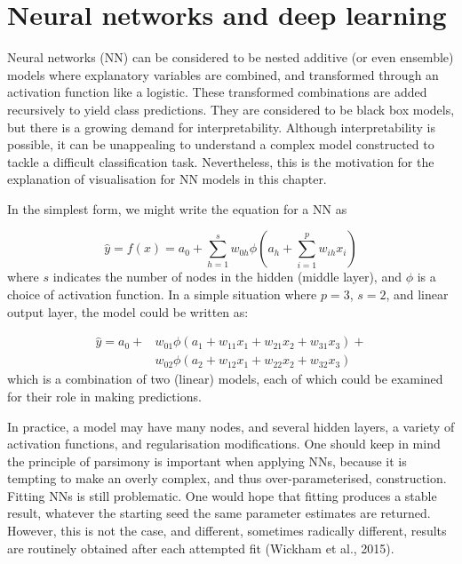 \documentclass[
  letterpaper,
]{krantz}
\begin{document}

\chapter{Neural networks and deep
learning}\label{neural-networks-and-deep-learning}


Neural networks (NN) can be considered to be nested additive (or even
ensemble) models where explanatory variables are combined, and
transformed through an activation function like a logistic. These
transformed combinations are added recursively to yield class
predictions. They are considered to be black box models, but there is a
growing demand for interpretability. Although interpretability is
possible, it can be unappealing to understand a complex model
constructed to tackle a difficult classification task. Nevertheless,
this is the motivation for the explanation of visualisation for NN
models in this chapter.

In the simplest form, we might write the equation for a NN as

\[
\hat{y} = f(x) = a_0+\sum_{h=1}^{s}
w_{0h}\phi(a_h+\sum_{i=1}^{p} w_{ih}x_i)
\] where \(s\) indicates the number of nodes in the hidden (middle
layer), and \(\phi\) is a choice of activation function. In a simple
situation where \(p=3\), \(s=2\), and linear output layer, the model
could be written as:

\[
\begin{aligned}
\hat{y} = a_0+ & w_{01}\phi(a_1+w_{11}x_1+w_{21}x_2+w_{31}x_3) +\\
 & w_{02}\phi(a_2+w_{12}x_1+w_{22}x_2+w_{32}x_3)
\end{aligned}
\] which is a combination of two (linear) models, each of which could be
examined for their role in making predictions.

In practice, a model may have many nodes, and several hidden layers, a
variety of activation functions, and regularisation modifications. One
should keep in mind the principle of parsimony is important when
applying NNs, because it is tempting to make an overly complex, and thus
over-parameterised, construction. Fitting NNs is still problematic. One
would hope that fitting produces a stable result, whatever the starting
seed the same parameter estimates are returned. However, this is not the
case, and different, sometimes radically different, results are
routinely obtained after each attempted fit (Wickham et al., 2015).
\end{document}

